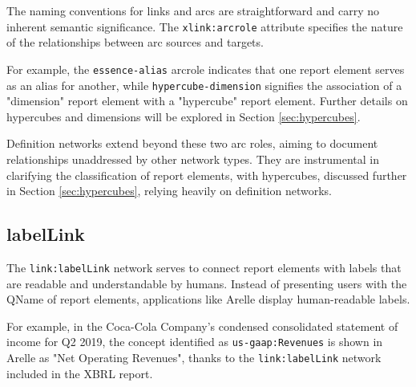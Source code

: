 The naming conventions for links and arcs are straightforward and carry no inherent semantic significance.  
The \texttt{xlink:arcrole} attribute specifies the nature of the relationships between arc sources and targets.  

For example, the \texttt{essence-alias} arcrole indicates that one report element serves as an alias for another,  
while \texttt{hypercube-dimension} signifies the association of a "dimension" report element with a "hypercube" report element.  
Further details on hypercubes and dimensions will be explored in Section \ref{sec:hypercubes}.  

Definition networks extend beyond these two arc roles, aiming to document relationships unaddressed by other network types.  
They are instrumental in clarifying the classification of report elements,  
with hypercubes, discussed further in Section \ref{sec:hypercubes}, relying heavily on definition networks.

\subsection{labelLink}
\label{sec:labelLink}



The \texttt{link:labelLink} network serves to connect report elements with labels that are readable and understandable by humans.
Instead of presenting users with the QName of report elements, applications like Arelle display human-readable labels.

For example, in the Coca-Cola Company's condensed consolidated statement of income for Q2 2019\cite{ko2019q2},
the concept identified as \texttt{us-gaap:Revenues} is shown in Arelle as "Net Operating Revenues",
thanks to the \texttt{link:labelLink} network included in the XBRL report.

